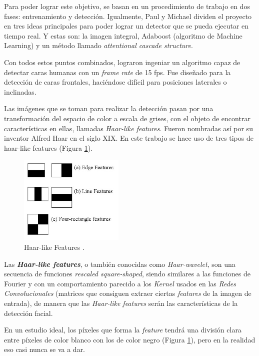 Para poder lograr este objetivo, se basan en un procedimiento de trabajo en dos fases: entrenamiento y detección. Igualmente, Paul y Michael dividen el proyecto en tres ideas principales para poder lograr un detector que se pueda ejecutar en tiempo real. Y estas son: la imagen integral, Adaboost (algoritmo de Machine Learning) y un método llamado \textit{attentional cascade structure}. 

Con todos estos puntos combinados, lograron ingeniar un algoritmo capaz de detectar caras humanas con un \textit{frame rate} de 15 fps. Fue diseñado para la detección de caras frontales, haciéndose difícil para posiciones laterales o inclinadas.

Las imágenes que se toman para realizar la detección pasan por una transformación del espacio de color a escala de grises, con el objeto de encontrar características en ellas, llamadas \textit{Haar-like features}. Fueron nombradas así por su inventor Alfred Haar en el siglo XIX. En este trabajo se hace uso de tres tipos de haar-like features (Figura \ref{fig:haarLike}).

\begin{figure}[htp]
	\centering
	\includegraphics[width=5cm]{imagenes/haar-like.jpeg}
	\caption[Haar-like Features.]{Haar-like Features \cite{haar-like}.}
	\label{fig:haarLike}
\end{figure}
\vspace{-0.3cm}
Las \textbf{\textit{Haar-like features}}, o también conocidas como \textit{Haar-wavelet}, son una secuencia de funciones \textit{rescaled square-shaped}, siendo similares a las funciones de Fourier y con un comportamiento parecido a los \textit{Kernel} usados en las \textit{Redes Convolucionales} (matrices que consiguen extraer ciertas \textit{features} de la imagen de entrada), de manera que las \textit{Haar-like features} serán las características de la detección facial.

En un estudio ideal, los píxeles que forma la \textit{feature} tendrá una división clara entre píxeles de color blanco con los de color negro (Figura \ref{fig:haarLike}), pero en la realidad eso casi nunca se va a dar.

